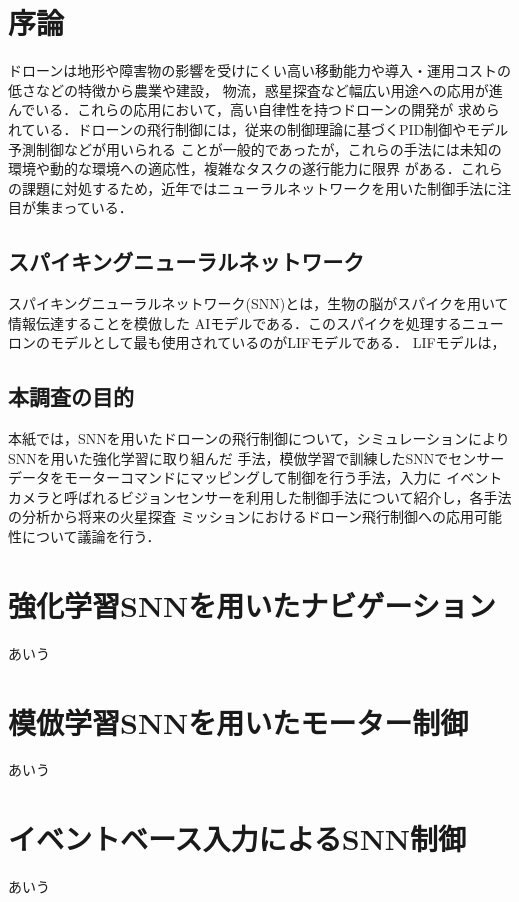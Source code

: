 \documentclass[a4paper,10.5pt,dvipdfmx]{bxjsarticle}
\begin{document}
\begin{multicols}{2}

\section{序論}
ドローンは地形や障害物の影響を受けにくい高い移動能力や導入・運用コストの低さなどの特徴から農業や建設，
物流，惑星探査など幅広い用途への応用が進んでいる．これらの応用において，高い自律性を持つドローンの開発が
求められている．ドローンの飛行制御には，従来の制御理論に基づくPID制御やモデル予測制御などが用いられる
ことが一般的であったが，これらの手法には未知の環境や動的な環境への適応性，複雑なタスクの遂行能力に限界
がある．これらの課題に対処するため，近年ではニューラルネットワークを用いた制御手法に注目が集まっている．


\subsection{スパイキングニューラルネットワーク}
スパイキングニューラルネットワーク(SNN)とは，生物の脳がスパイクを用いて情報伝達することを模倣した
AIモデルである．このスパイクを処理するニューロンのモデルとして最も使用されているのがLIFモデルである．
LIFモデルは，

\subsection{本調査の目的}
本紙では，SNNを用いたドローンの飛行制御について，シミュレーションによりSNNを用いた強化学習に取り組んだ
手法，模倣学習で訓練したSNNでセンサーデータをモーターコマンドにマッピングして制御を行う手法，入力に
イベントカメラと呼ばれるビジョンセンサーを利用した制御手法について紹介し，各手法の分析から将来の火星探査
ミッションにおけるドローン飛行制御への応用可能性について議論を行う．

\section{強化学習SNNを用いたナビゲーション}
あいう\cite{lee2025bio}

\section{模倣学習SNNを用いたモーター制御}
あいう\cite{stroobants2025neuromorphic}

\section{イベントベース入力によるSNN制御}
あいう\cite{paredes2024fully}

\end{multicols}
\end{document}
